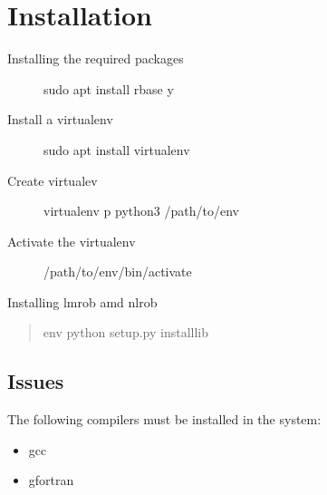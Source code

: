 \documentclass[letterpaper,10pt,english]{sphinxmanual}
\begin{document}
\chapter{Installation}
\label{\detokenize{Installation:id1}}\begin{description}
\item[{Installing the required packages}] \leavevmode
{}%
\begin{sphinxVerbatim}[commandchars=\\\{\}]
\PYGZdl{} sudo apt install r\PYGZhy{}base \PYGZhy{}y
\end{sphinxVerbatim}

\item[{Install a virtualenv}] \leavevmode
{}%
\begin{sphinxVerbatim}[commandchars=\\\{\}]
sudo apt install virtualenv
\end{sphinxVerbatim}

\item[{Create virtualev}] \leavevmode
{}%
\begin{sphinxVerbatim}[commandchars=\\\{\}]
\PYGZdl{} virtualenv \PYGZhy{}p python3 /path/to/env
\end{sphinxVerbatim}

\item[{Activate the virtualenv}] \leavevmode
{}%
\begin{sphinxVerbatim}[commandchars=\\\{\}]
\PYGZdl{}  /path/to/env/bin/activate
\end{sphinxVerbatim}

\end{description}

Installing lmrob amd nlrob
\begin{quote}

%
\begin{sphinxVerbatim}[commandchars=\\\{\}]
env \PYGZdl{} python setup.py install\PYGZus{}lib
\end{sphinxVerbatim}
\end{quote}


\section{Issues}
\label{\detokenize{Installation:issues}}
The following compilers must be installed in the system:
\begin{itemize}
\item {} 
gcc

\item {} 
gfortran

\end{itemize}
\end{document}
